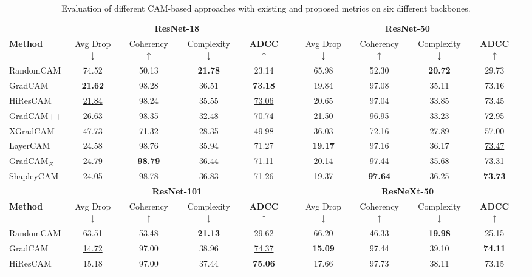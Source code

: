 \begin{table*}[htbp]
\small
\setlength{\tabcolsep}{.25em}
\centering
\caption{Evaluation of different CAM-based approaches with existing and proposed metrics on six different backbones.}
\label{tab:results}
\begin{tabular}{l cccc c cccc c}
\hline
& \multicolumn{4}{c}{\textbf{ResNet-18}} & & \multicolumn{4}{c}{\textbf{ResNet-50}} \\
\cline{2-5} \cline{7-10}
\textbf{Method} & Avg Drop $\downarrow$ & Coherency $\uparrow$ & Complexity $\downarrow$ & \textbf{ADCC} $\uparrow$ & & Avg Drop $\downarrow$ & Coherency $\uparrow$ & Complexity $\downarrow$ & \textbf{ADCC} $\uparrow$ \\
\hline
RandomCAM & 74.52 & 50.13 & \textbf{21.78} & 23.14 & & 65.98 & 52.30 & \textbf{20.72} & 29.73 \\
GradCAM & \textbf{21.62} & 98.28 & 36.51 & \textbf{73.18} & & 19.84 & 97.08 & 35.11 & 73.16 \\
HiResCAM & \underline{21.84} & 98.24 & 35.55 & \underline{73.06} & & 20.65 & 97.04 & 33.85 & 73.45 \\
GradCAM++ & 26.63 & 98.35 & 32.48 & 70.74 & & 21.50 & 96.95 & 33.23 & 72.95 \\
XGradCAM & 47.73 & 71.32 & \underline{28.35} & 49.98 & & 36.03 & 72.16 & \underline{27.89} & 57.00 \\
LayerCAM & 24.58 & 98.76 & 35.94 & 71.27 & & \textbf{19.17} & 97.16 & 36.17 & \underline{73.47} \\
$\text{GradCAM}_{E}$ & 24.79 & \textbf{98.79} & 36.44 & 71.11 & & 20.14 & \underline{97.44} & 35.68 & 73.31 \\
ShapleyCAM & 24.05 & \underline{98.78} & 36.83 & 71.26 & & \underline{19.37} & \textbf{97.64} & 36.25 & \textbf{73.73} \\
\hline
& \multicolumn{4}{c}{\textbf{ResNet-101}} & & \multicolumn{4}{c}{\textbf{ResNeXt-50}} \\
\cline{2-5} \cline{7-10}
\textbf{Method} & Avg Drop $\downarrow$ & Coherency $\uparrow$ & Complexity $\downarrow$ & \textbf{ADCC} $\uparrow$ & & Avg Drop $\downarrow$ & Coherency $\uparrow$ & Complexity $\downarrow$ & \textbf{ADCC} $\uparrow$ \\
\hline
RandomCAM & 63.51 & 53.48 & \textbf{21.13} & 29.62 & & 66.20 & 46.33 & \textbf{19.98} & 25.15 \\
GradCAM & \underline{14.72} & 97.00 & 38.96 & \underline{74.37} & & \textbf{15.09} & 97.44 & 39.10 & \textbf{74.11} \\
HiResCAM & 15.18 & 97.00 & 37.44 & \textbf{75.06} & & 17.66 & 97.73 & 38.11 & 73.15 \\

\end{tabular}
\end{table*}
